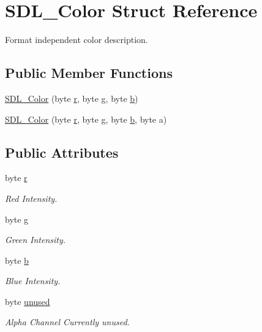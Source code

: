 \hypertarget{struct_s_d_l___color}{
\section{SDL\_\-Color Struct Reference}
\label{struct_s_d_l___color}
}


Format independent color description.  


\subsection*{Public Member Functions}
\begin{DoxyCompactItemize}
\item 
\hyperlink{struct_s_d_l___color_a57baa1071ae8bd6c4b9036b16987520a}{SDL\_\-Color} (byte \hyperlink{struct_s_d_l___color_a6b604b87f66fec29eb97d00dae9cb83d}{r}, byte \hyperlink{struct_s_d_l___color_a00e502b139916cdd32418c00c6d3af96}{g}, byte \hyperlink{struct_s_d_l___color_afcab9cae0bb36b286b472fd2d90f9ea5}{b})
\item 
\hyperlink{struct_s_d_l___color_a5c2cef8c081490e2fc1e2c0e3d0d36fc}{SDL\_\-Color} (byte \hyperlink{struct_s_d_l___color_a6b604b87f66fec29eb97d00dae9cb83d}{r}, byte \hyperlink{struct_s_d_l___color_a00e502b139916cdd32418c00c6d3af96}{g}, byte \hyperlink{struct_s_d_l___color_afcab9cae0bb36b286b472fd2d90f9ea5}{b}, byte a)
\end{DoxyCompactItemize}
\subsection*{Public Attributes}
\begin{DoxyCompactItemize}
\item 
byte \hyperlink{struct_s_d_l___color_a6b604b87f66fec29eb97d00dae9cb83d}{r}
\begin{DoxyCompactList}\small\item\em Red Intensity. \item\end{DoxyCompactList}\item 
byte \hyperlink{struct_s_d_l___color_a00e502b139916cdd32418c00c6d3af96}{g}
\begin{DoxyCompactList}\small\item\em Green Intensity. \item\end{DoxyCompactList}\item 
byte \hyperlink{struct_s_d_l___color_afcab9cae0bb36b286b472fd2d90f9ea5}{b}
\begin{DoxyCompactList}\small\item\em Blue Intensity. \item\end{DoxyCompactList}\item 
byte \hyperlink{struct_s_d_l___color_ae5fb155439a0f95e8c58d44a40474081}{unused}
\begin{DoxyCompactList}\small\item\em Alpha Channel Currently unused. \item\end{DoxyCompactList}\end{DoxyCompactItemize}


